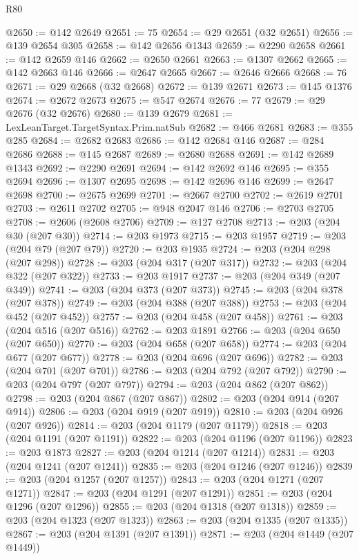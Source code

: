 \begin{lexlean}{R80}
\begin{coremodule}
@2650 := @142 @2649
@2651 := 75
@2654 := @29 @2651 (@32 @2651)
@2656 := @139 @2654 @305
@2658 := @142 @2656 @1343
@2659 := @2290 @2658
@2661 := @142 @2659 @146
@2662 := @2650 @2661
@2663 := @1307 @2662
@2665 := @142 @2663 @146
@2666 := @2647 @2665
@2667 := @2646 @2666
@2668 := 76
@2671 := @29 @2668 (@32 @2668)
@2672 := @139 @2671
@2673 := @145 @1376
@2674 := @2672 @2673
@2675 := @547 @2674
@2676 := 77
@2679 := @29 @2676 (@32 @2676)
@2680 := @139 @2679
@2681 := LexLeanTarget.TargetSyntax.Prim.natSub
@2682 := @466 @2681
@2683 := @355 @285
@2684 := @2682 @2683
@2686 := @142 @2684 @146
@2687 := @284 @2686
@2688 := @145 @2687
@2689 := @2680 @2688
@2691 := @142 @2689 @1343
@2692 := @2290 @2691
@2694 := @142 @2692 @146
@2695 := @355 @2694
@2696 := @1307 @2695
@2698 := @142 @2696 @146
@2699 := @2647 @2698
@2700 := @2675 @2699
@2701 := @2667 @2700
@2702 := @2619 @2701
@2703 := @2611 @2702
@2705 := @948 @2047 @146
@2706 := @2703 @2705
@2708 := @2606 (@2608 @2706)
@2709 := @127 @2708
@2713 := @203 (@204 @30 (@207 @30))
@2714 := @203 @1973
@2715 := @203 @1957
@2719 := @203 (@204 @79 (@207 @79))
@2720 := @203 @1935
@2724 := @203 (@204 @298 (@207 @298))
@2728 := @203 (@204 @317 (@207 @317))
@2732 := @203 (@204 @322 (@207 @322))
@2733 := @203 @1917
@2737 := @203 (@204 @349 (@207 @349))
@2741 := @203 (@204 @373 (@207 @373))
@2745 := @203 (@204 @378 (@207 @378))
@2749 := @203 (@204 @388 (@207 @388))
@2753 := @203 (@204 @452 (@207 @452))
@2757 := @203 (@204 @458 (@207 @458))
@2761 := @203 (@204 @516 (@207 @516))
@2762 := @203 @1891
@2766 := @203 (@204 @650 (@207 @650))
@2770 := @203 (@204 @658 (@207 @658))
@2774 := @203 (@204 @677 (@207 @677))
@2778 := @203 (@204 @696 (@207 @696))
@2782 := @203 (@204 @701 (@207 @701))
@2786 := @203 (@204 @792 (@207 @792))
@2790 := @203 (@204 @797 (@207 @797))
@2794 := @203 (@204 @862 (@207 @862))
@2798 := @203 (@204 @867 (@207 @867))
@2802 := @203 (@204 @914 (@207 @914))
@2806 := @203 (@204 @919 (@207 @919))
@2810 := @203 (@204 @926 (@207 @926))
@2814 := @203 (@204 @1179 (@207 @1179))
@2818 := @203 (@204 @1191 (@207 @1191))
@2822 := @203 (@204 @1196 (@207 @1196))
@2823 := @203 @1873
@2827 := @203 (@204 @1214 (@207 @1214))
@2831 := @203 (@204 @1241 (@207 @1241))
@2835 := @203 (@204 @1246 (@207 @1246))
@2839 := @203 (@204 @1257 (@207 @1257))
@2843 := @203 (@204 @1271 (@207 @1271))
@2847 := @203 (@204 @1291 (@207 @1291))
@2851 := @203 (@204 @1296 (@207 @1296))
@2855 := @203 (@204 @1318 (@207 @1318))
@2859 := @203 (@204 @1323 (@207 @1323))
@2863 := @203 (@204 @1335 (@207 @1335))
@2867 := @203 (@204 @1391 (@207 @1391))
@2871 := @203 (@204 @1449 (@207 @1449))

\end{coremodule}
\end{lexlean}
